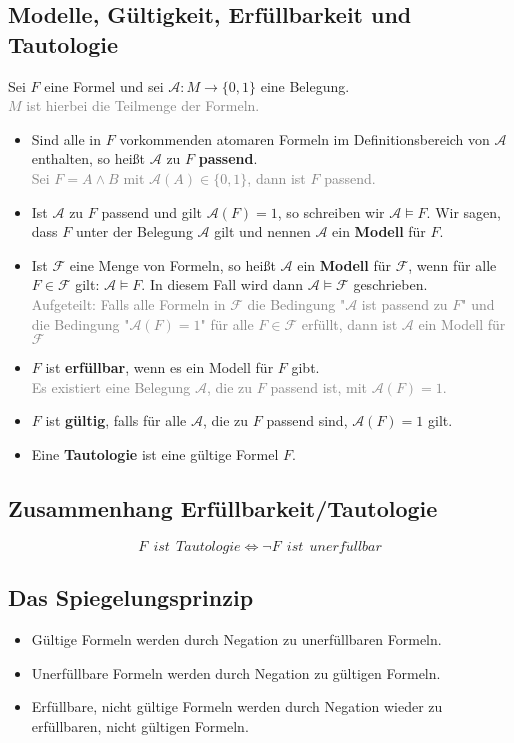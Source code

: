 \documentclass{article}
\begin{document}
	\subsection{Modelle, Gültigkeit, Erfüllbarkeit und Tautologie}
	Sei $F$ eine Formel und sei $\mathcal{A} : M \rightarrow \{0,1\}$ eine Belegung. \\
	\textcolor{gray}{$M$ ist hierbei die Teilmenge der Formeln.}
	\begin{itemize}
		\item Sind alle in $F$ vorkommenden atomaren Formeln im Definitionsbereich von $\mathcal{A}$ enthalten, so heißt $\mathcal{A}$ zu $F$ \textbf{passend}.\\
		\textcolor{gray}{Sei $F = A \wedge B$ mit $\mathcal{A}(A) \in \{0,1\}$, dann ist $F$ passend.}
		\item Ist $\mathcal{A}$ zu $F$ passend und gilt $\mathcal{A}(F) = 1$, so schreiben wir $\mathcal{A} \vDash F$. Wir sagen, dass $F$ unter der Belegung $\mathcal{A}$ gilt und nennen $\mathcal{A}$ ein \textbf{Modell} für $F$.
		\item Ist $\mathcal{F}$ eine Menge von Formeln, so heißt $\mathcal{A}$ ein \textbf{Modell} für $\mathcal{F}$, wenn für alle $F \in \mathcal{F}$ gilt: $\mathcal{A} \vDash F$. In diesem Fall wird dann $\mathcal{A} \vDash \mathcal{F}$ geschrieben. \\
		\textcolor{gray}{Aufgeteilt: Falls alle Formeln in $\mathcal{F}$ die Bedingung "$\mathcal{A}$ ist passend zu $F$" und die Bedingung "$\mathcal{A}(F)=1$" für alle $F \in \mathcal{F}$ erfüllt, dann ist $\mathcal{A}$ ein Modell für $\mathcal{F}$}
		\item $F$ ist \textbf{erfüllbar}, wenn es ein Modell für $F$ gibt. \\
		\textcolor{gray}{Es existiert eine Belegung $\mathcal{A}$, die zu $F$ passend ist, mit $\mathcal{A}(F) = 1$.}
		\item $F$ ist \textbf{gültig}, falls für alle $\mathcal{A}$, die zu $F$ passend sind, $\mathcal{A}(F) = 1$ gilt.
		\item Eine \textbf{Tautologie} ist eine gültige Formel $F$.
	\end{itemize}
	\subsection{Zusammenhang Erfüllbarkeit/Tautologie}
	\[F \:\: ist \:\: Tautologie \Leftrightarrow \neg F \:\: ist \:\: unerf\ddot{u}llbar\]
	\subsection{Das Spiegelungsprinzip}
	\begin{itemize}
		\item Gültige Formeln werden durch Negation zu unerfüllbaren Formeln. 
		\item Unerfüllbare Formeln werden durch Negation zu gültigen Formeln.
		\item Erfüllbare, nicht gültige Formeln werden durch Negation wieder zu erfüllbaren, nicht gültigen Formeln.
	\end{itemize}
\end{document}
